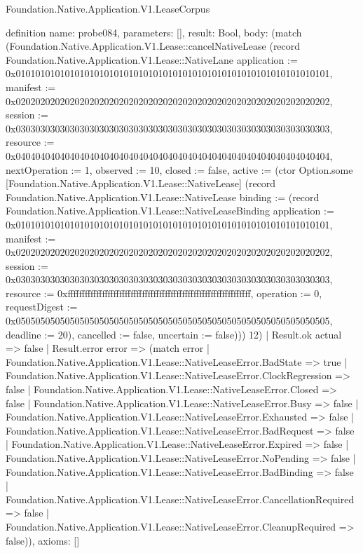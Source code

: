 \begin{lexlean}{Foundation.Native.Application.V1.LeaseCorpus}
\begin{semanticmodule}
definition{
  name: probe084,
  parameters: [],
  result: Bool,
  body: (match (Foundation.Native.Application.V1.Lease::cancelNativeLease (record Foundation.Native.Application.V1.Lease::NativeLane {application := 0x0101010101010101010101010101010101010101010101010101010101010101, manifest := 0x0202020202020202020202020202020202020202020202020202020202020202, session := 0x0303030303030303030303030303030303030303030303030303030303030303, resource := 0x0404040404040404040404040404040404040404040404040404040404040404, nextOperation := 1, observed := 10, closed := false, active := (ctor Option.some [Foundation.Native.Application.V1.Lease::NativeLease] (record Foundation.Native.Application.V1.Lease::NativeLease {binding := (record Foundation.Native.Application.V1.Lease::NativeLeaseBinding {application := 0x0101010101010101010101010101010101010101010101010101010101010101, manifest := 0x0202020202020202020202020202020202020202020202020202020202020202, session := 0x0303030303030303030303030303030303030303030303030303030303030303, resource := 0xffffffffffffffffffffffffffffffffffffffffffffffffffffffffffffffff, operation := 0, requestDigest := 0x0505050505050505050505050505050505050505050505050505050505050505, deadline := 20}), cancelled := false, uncertain := false}))}) 12)
    | Result.ok actual => false
    | Result.error error => (match error
      | Foundation.Native.Application.V1.Lease::NativeLeaseError.BadState => true
      | Foundation.Native.Application.V1.Lease::NativeLeaseError.ClockRegression => false
      | Foundation.Native.Application.V1.Lease::NativeLeaseError.Closed => false
      | Foundation.Native.Application.V1.Lease::NativeLeaseError.Busy => false
      | Foundation.Native.Application.V1.Lease::NativeLeaseError.Exhausted => false
      | Foundation.Native.Application.V1.Lease::NativeLeaseError.BadRequest => false
      | Foundation.Native.Application.V1.Lease::NativeLeaseError.Expired => false
      | Foundation.Native.Application.V1.Lease::NativeLeaseError.NoPending => false
      | Foundation.Native.Application.V1.Lease::NativeLeaseError.BadBinding => false
      | Foundation.Native.Application.V1.Lease::NativeLeaseError.CancellationRequired => false
      | Foundation.Native.Application.V1.Lease::NativeLeaseError.CleanupRequired => false)),
  axioms: []
}


\end{semanticmodule}
\end{lexlean}
